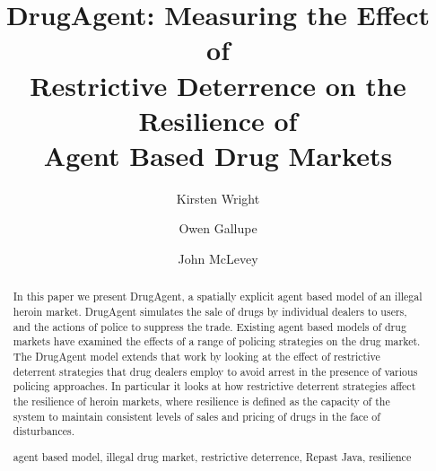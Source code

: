 \documentclass[runningheads,a4paper]{llncs}
\newcommand{\keywords}[1]{\par\addvspace\baselineskip
\noindent\keywordname\enspace\ignorespaces#1}
\begin{document}
\mainmatter  %

\title{DrugAgent: Measuring the Effect of \\Restrictive Deterrence on the Resilience of \\Agent Based Drug Markets}
%
%
\author{Kirsten Wright %
\and Owen Gallupe \and John McLevey}
%




\maketitle


\begin{abstract}

In this paper we present DrugAgent, a spatially explicit agent based model of an illegal heroin market. DrugAgent simulates the sale of drugs by individual dealers to users, and the actions of police to suppress the trade. Existing agent based models of drug markets have examined the effects of a range of policing strategies on the drug market. The DrugAgent model extends that work by looking at the effect of restrictive deterrent strategies that drug dealers employ to avoid arrest in the presence of various policing approaches. In particular it looks at how restrictive deterrent strategies affect the resilience of heroin markets, where resilience is defined as the capacity of the system to maintain consistent levels of sales and pricing of drugs in the face of disturbances.


\keywords{agent based model, illegal drug market, restrictive deterrence, Repast Java, resilience}
\end{abstract}
\end{document}
